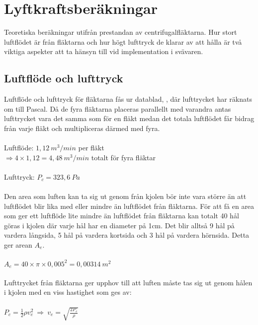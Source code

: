 \section{Lyftkraftsberäkningar}
\label{app:lyftkraftsberakningar}

Teoretiska beräkningar utifrån prestandan av centrifugalfläktarna. Hur stort
luftflödet är från fläktarna och hur högt lufttryck de klarar av att hålla är
två viktiga aspekter att ta hänsyn till vid implementation i svävaren.

\subsection{Luftflöde och lufttryck}
Luftflöde och lufttryck för fläktarna fås ur datablad,
\cite{Delta_BFB1212VH-R00}, där lufttrycket har räknats om till Pascal. Då de
fyra fläktarna placeras parallellt med varandra antas lufttrycket vara det samma
som för en fläkt medan det totala luftflödet får bidrag från varje fläkt och
multipliceras därmed med fyra. \\ \\
Luftflöde: $1,12\ m^3/min$ per fläkt \\
\begin{math}
\Rightarrow 4\times1,12=4,48\ m^3/min
\end{math} totalt för fyra fläktar \\ \\
Lufttryck: $P_{c}=323,6\ Pa$ \\ \\
Den area som luften kan ta sig ut genom från kjolen bör inte vara större än att
luftflödet blir lika med eller mindre än luftflödet från fläktarna. För att få
en area som ger ett luftflöde lite mindre än luftflödet från fläktarna kan
totalt 40 hål göras i kjolen där varje hål har en diameter på 1cm. Det blir
alltså 9 hål på vardera långsida, 5 hål på vardera kortsida och 3 hål på vardera
hörnsida. Detta ger arean $ A_{e}$. \\ \\
\begin{math}
A_{e}=40\times\pi\times0,005^2=0,00314\ m^2
\end{math} \\ \\
Lufttrycket från fläktarna ger upphov till att luften måste tas sig ut genom
hålen i kjolen med en viss hastighet som ges av: \\ \\
\begin{math}
P_{c}=\frac{1}{2} \rho v_{e}^2\ \Rightarrow\ v_{e}=\sqrt{\frac{2P_{c}}{\rho}}
\end{math} \\ \\
